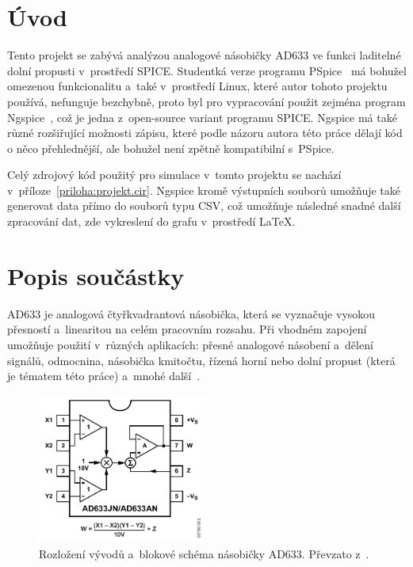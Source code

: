 \documentclass{protokol}
\begin{document}
	\maketitle

\section*{Úvod}
	Tento projekt se zabývá analýzou analogové násobičky AD633 ve funkci laditelné dolní propusti v~prostředí SPICE. Studentká verze programu PSpice~\cite{cadence} má bohužel omezenou funkcionalitu a~také v~prostředí Linux, které autor tohoto projektu používá, nefunguje bezchybně, proto byl pro vypracování použit zejména program Ngspice~\cite{ngspice}, což je jedna z~open-source variant programu SPICE. Ngspice má také různé rozšiřující možnosti zápisu, které podle názoru autora této práce dělají kód o něco přehlednější, ale bohužel není zpětně kompatibilní s~PSpice.

	Celý zdrojový kód použitý pro simulace v~tomto projektu se nachází v~příloze~\ref{priloha:projekt.cir}. Ngspice kromě výstupních souborů umožňuje také generovat data přímo do souborů typu CSV, což umožňuje následné snadné další zpracování dat, zde vykreslení do grafu v~prostředí LaTeX.
\section{Popis součástky}
	AD633 je analogová čtyřkvadrantová násobička, která se vyznačuje vysokou přesností a~linearitou na celém pracovním rozsahu. Při vhodném zapojení umožňuje použití v~různých aplikacích: přesné analogové násobení a~dělení signálů, odmocnina, násobička kmitočtu, řízená horní nebo dolní propust (která je tématem této práce) a~mnohé další~\cite{ad633datasheet}.

	\begin{figure}[h!]
		\centering
		\includegraphics[width=0.5\textwidth]{img/ad633.png}
		\caption{Rozložení vývodů a~blokové schéma násobičky AD633. Převzato z~\cite{ad633datasheet}.}
		\label{fig:img-ad633.png}
	\end{figure}
	
\end{document}

